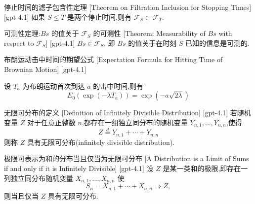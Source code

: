 \documentclass[UTF8]{ctexart}
\begin{document}
    
    
    \begin{thm}
        {停止时间的滤子包含性定理}
        [Theorem on Filtration Inclusion for Stopping Times]
        [gpt-4.1]
        如果 $S \leq T$ 是两个停止时间,则有 $\mathcal{F}_S \subset \mathcal{F}_T$.
    \end{thm}
    
    
    
    \begin{thm}
        {可测性定理:$Bs$ 的值关于 $\mathcal{F}_S$ 的可测性}
        [Theorem: Measurability of $Bs$ with respect to $\mathcal{F}_S$]
        [gpt-4.1]
        $Bs \in \mathcal{F}_S$, 即 $Bs$ 的值关于在时刻 $S$ 已知的信息是可测的.
    \end{thm}
    
    
    
    \begin{thm}
        {布朗运动击中时间的期望公式}
        [Expectation Formula for Hitting Time of Brownian Motion]
        [gpt-4.1]
        
设 $T_a$ 为布朗运动首次到达 $a$ 的击中时间,则有
\[
E_{0}(\exp(-\lambda T_{a})) = \exp(-a \sqrt{2\lambda})
\]

    \end{thm}
    
    
    
    \begin{dfn}
        {无限可分布的定义}
        [Definition of Infinitely Divisible Distribution]
        [gpt-4.1]
        若随机变量 $Z$ 对于任意正整数 $n$,都存在一组独立同分布的随机变量 $Y_{n,1}, \dots, Y_{n,n}$,使得
\[
Z \overset{d}{=} Y_{n,1} + \cdots + Y_{n,n}
\]
则称 $Z$ 具有无限可分布(infinitely divisible distribution).

    \end{dfn}
    
    
    
    \begin{thm}
        {极限可表示为和的分布当且仅当为无限可分布}
        [A Distribution is a Limit of Sums if and only if it is Infinitely Divisible]
        [gpt-4.1]
        设 $Z$ 是某一类和的极限,即存在一列独立同分布随机变量 $X_{n,1}, \dots, X_{n,n}$ 使
\[
S_n = X_{n,1} + \cdots + X_{n,n} \Rightarrow Z,
\]
则当且仅当 $Z$ 具有无限可分布.

    \end{thm}
    
\end{document}
